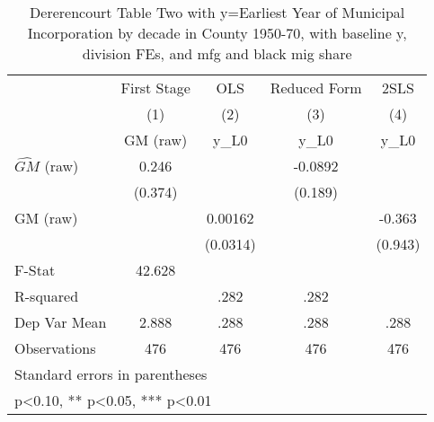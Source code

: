 \begin{table}[htbp]\centering
\def\sym#1{\ifmmode^{#1}\else\(^{#1}\)\fi}
\caption{Dererencourt Table Two with y=Earliest Year of Municipal Incorporation by decade in County 1950-70, with baseline y, division FEs, and mfg and black mig share}
\begin{tabular}{l*{4}{c}}
\toprule
                    & First Stage   &         OLS   &Reduced Form   &        2SLS   \\
                    &\multicolumn{1}{c}{(1)}&\multicolumn{1}{c}{(2)}&\multicolumn{1}{c}{(3)}&\multicolumn{1}{c}{(4)}\\
                    &\multicolumn{1}{c}{GM  (raw)}&\multicolumn{1}{c}{y\_L0}&\multicolumn{1}{c}{y\_L0}&\multicolumn{1}{c}{y\_L0}\\
\midrule
$\hat{GM}$ (raw)    &       0.246   &               &     -0.0892   &               \\
                    &     (0.374)   &               &     (0.189)   &               \\
\addlinespace
GM  (raw)           &               &     0.00162   &               &      -0.363   \\
                    &               &    (0.0314)   &               &     (0.943)   \\
\midrule
F-Stat              &      42.628   &               &               &               \\
R-squared           &               &        .282   &        .282   &               \\
Dep Var Mean        &       2.888   &        .288   &        .288   &        .288   \\
Observations        &         476   &         476   &         476   &         476   \\
\bottomrule
\multicolumn{5}{l}{\footnotesize Standard errors in parentheses}\\
\multicolumn{5}{l}{\footnotesize * p<0.10, ** p<0.05, *** p<0.01}\\
\end{tabular}
\end{table}

